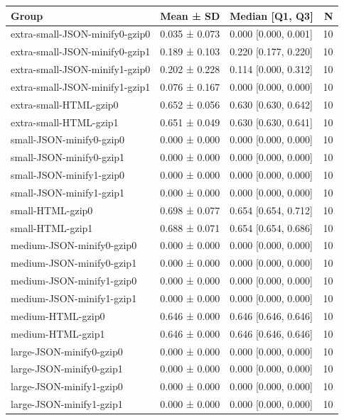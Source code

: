 \begin{tabular}{lllr}
\toprule
Group & Mean ± SD & Median [Q1, Q3] & N \\
\midrule
extra-small-JSON-minify0-gzip0 & 0.035 ± 0.073 & 0.000 [0.000, 0.001] & 10 \\
extra-small-JSON-minify0-gzip1 & 0.189 ± 0.103 & 0.220 [0.177, 0.220] & 10 \\
extra-small-JSON-minify1-gzip0 & 0.202 ± 0.228 & 0.114 [0.000, 0.312] & 10 \\
extra-small-JSON-minify1-gzip1 & 0.076 ± 0.167 & 0.000 [0.000, 0.000] & 10 \\
extra-small-HTML-gzip0 & 0.652 ± 0.056 & 0.630 [0.630, 0.642] & 10 \\
extra-small-HTML-gzip1 & 0.651 ± 0.049 & 0.630 [0.630, 0.641] & 10 \\
small-JSON-minify0-gzip0 & 0.000 ± 0.000 & 0.000 [0.000, 0.000] & 10 \\
small-JSON-minify0-gzip1 & 0.000 ± 0.000 & 0.000 [0.000, 0.000] & 10 \\
small-JSON-minify1-gzip0 & 0.000 ± 0.000 & 0.000 [0.000, 0.000] & 10 \\
small-JSON-minify1-gzip1 & 0.000 ± 0.000 & 0.000 [0.000, 0.000] & 10 \\
small-HTML-gzip0 & 0.698 ± 0.077 & 0.654 [0.654, 0.712] & 10 \\
small-HTML-gzip1 & 0.688 ± 0.071 & 0.654 [0.654, 0.686] & 10 \\
medium-JSON-minify0-gzip0 & 0.000 ± 0.000 & 0.000 [0.000, 0.000] & 10 \\
medium-JSON-minify0-gzip1 & 0.000 ± 0.000 & 0.000 [0.000, 0.000] & 10 \\
medium-JSON-minify1-gzip0 & 0.000 ± 0.000 & 0.000 [0.000, 0.000] & 10 \\
medium-JSON-minify1-gzip1 & 0.000 ± 0.000 & 0.000 [0.000, 0.000] & 10 \\
medium-HTML-gzip0 & 0.646 ± 0.000 & 0.646 [0.646, 0.646] & 10 \\
medium-HTML-gzip1 & 0.646 ± 0.000 & 0.646 [0.646, 0.646] & 10 \\
large-JSON-minify0-gzip0 & 0.000 ± 0.000 & 0.000 [0.000, 0.000] & 10 \\
large-JSON-minify0-gzip1 & 0.000 ± 0.000 & 0.000 [0.000, 0.000] & 10 \\
large-JSON-minify1-gzip0 & 0.000 ± 0.000 & 0.000 [0.000, 0.000] & 10 \\
large-JSON-minify1-gzip1 & 0.000 ± 0.000 & 0.000 [0.000, 0.000] & 10 \\

\end{tabular}
